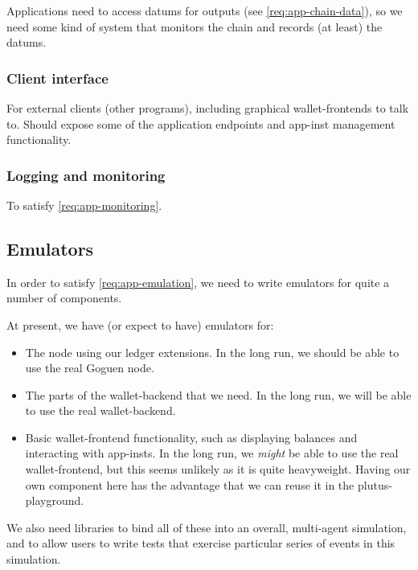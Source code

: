 \subsubsection{}

Applications need to access \glspl{datum} for outputs (see \cref{req:app-chain-data}), so we need some kind of system that monitors the chain and records (at least) the \glspl{datum}.

\subsubsection{Client interface}

For external clients (other programs), including graphical \glspl{wallet-frontend} to talk to.
Should expose some of the application endpoints and \gls{app-inst} management functionality.

\subsubsection{Logging and monitoring}

To satisfy \cref{req:app-monitoring}.

\subsection{Emulators}

In order to satisfy \cref{req:app-emulation}, we need to write emulators for quite a number of components.

At present, we have (or expect to have) emulators for:
\begin{itemize}
\item
  The \gls{node} using our ledger extensions.
  In the long run, we should be able to use the real Goguen \gls{node}.
\item
  The parts of the \gls{wallet-backend} that we need.
  In the long run, we will be able to use the real \gls{wallet-backend}.
\item
  Basic \gls{wallet-frontend} functionality, such as displaying balances and interacting with \glspl{app-inst}.
  In the long run, we \emph{might} be able to use the real \gls{wallet-frontend}, but this seems unlikely as it is quite heavyweight.
  Having our own component here has the advantage that we can reuse it in the \gls{plutus-playground}.
\end{itemize}

We also need libraries to bind all of these into an overall, multi-agent simulation, and to allow users to write tests that exercise particular series of events in this simulation.

